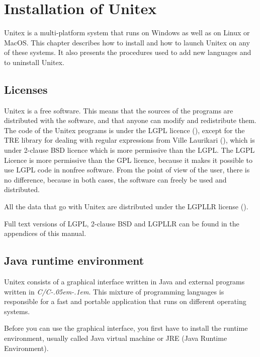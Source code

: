 \chapter{Installation of Unitex}
\label{chap-install}

Unitex is a multi-platform system that runs on Windows as well as on Linux or
MacOS. This chapter describes how to install and how to launch Unitex on any of
these systems. It also presents the procedures used to add new languages and to
uninstall Unitex.

\section{Licenses}
\label{section-licences}
Unitex is a free software. This means that the sources of the programs are
distributed with the software, and that anyone can modify and redistribute them.
The code of the Unitex programs is under the LGPL licence (\cite{LGPL}), except
for the TRE library for dealing with regular expressions from Ville Laurikari
(\cite{TRE}), which is under 2-clause BSD licence which is more
permissive than the LGPL. The LGPL Licence is more permissive than the GPL
licence, because it makes it possible to use LGPL code in nonfree software. 
From the point of view of the user, there is no difference,
because in both cases, the software can freely be used and distributed.

\bigskip
\noindent All the data that go with Unitex are distributed under the LGPLLR
license  (\cite{LGPLLR}).

\bigskip
\noindent Full text versions of LGPL, 2-clause BSD and LGPLLR can be found in
the appendices of this manual.

\section{Java runtime environment}
Unitex consists of a graphical interface written in Java and external programs
written in \textit{C/C\kern-.05em\raisebox{.5ex}{++}\kern-.1em}. This mixture of
programming languages is responsible for a fast and portable application that
runs on different operating systems.

\bigskip
\noindent Before you can use the graphical interface, you first have to install the runtime
environment, usually called Java virtual machine  or
JRE (Java Runtime Environment).

